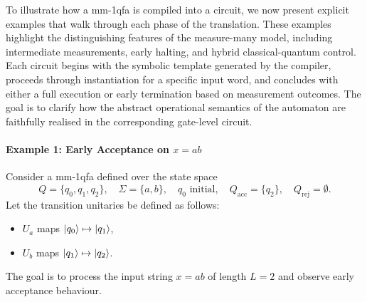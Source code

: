 To illustrate how a \gls{mm-1qfa} is compiled into a circuit, we now present explicit examples that walk through each phase of the translation. These examples highlight the distinguishing features of the measure-many model, including intermediate measurements, early halting, and hybrid classical-quantum control. Each circuit begins with the symbolic template generated by the compiler, proceeds through instantiation for a specific input word, and concludes with either a full execution or early termination based on measurement outcomes. The goal is to clarify how the abstract operational semantics of the automaton are faithfully realised in the corresponding gate-level circuit.

\paragraph{Example 1: Early Acceptance on $x = ab$} \label{ex:mmqfa-early-accept}
Consider a \gls{mm-1qfa} defined over the state space
\[
Q = \{q_0, q_1, q_2\}, \quad \Sigma = \{a, b\}, \quad q_0 \text{ initial}, \quad Q_{\text{acc}} = \{q_2\}, \quad Q_{\text{rej}} = \emptyset.
\]
Let the transition unitaries be defined as follows:
\begin{itemize}
  \item $U_a$ maps $\ket{q_0} \mapsto \ket{q_1}$,
  \item $U_b$ maps $\ket{q_1} \mapsto \ket{q_2}$.
\end{itemize}
The goal is to process the input string $x = ab$ of length $L = 2$ and observe early acceptance behaviour.

